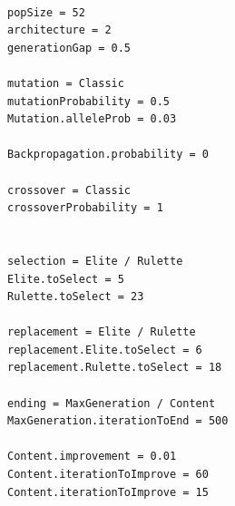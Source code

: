 \documentclass{sig-alternate}
\begin{document}
\begin{lstlisting}[caption={Archivo de configuración simple},label={code:simple}]

popSize = 52
architecture = 2
generationGap = 0.5

mutation = Classic
mutationProbability = 0.5
Mutation.alleleProb = 0.03

Backpropagation.probability = 0

crossover = Classic
crossoverProbability = 1


selection = Elite / Rulette
Elite.toSelect = 5
Rulette.toSelect = 23

replacement = Elite / Rulette
replacement.Elite.toSelect = 6
replacement.Rulette.toSelect = 18

ending = MaxGeneration / Content
MaxGeneration.iterationToEnd = 500

Content.improvement = 0.01
Content.iterationToImprove = 60
Content.iterationToImprove = 15

\end{lstlisting}
\end{document}
